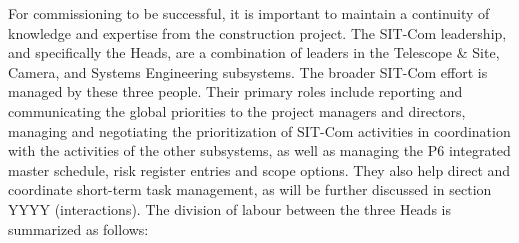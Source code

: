 \documentclass[SE,toc]{lsstdoc}
\begin{document}
For commissioning to be successful, it is important to maintain a continuity of knowledge and expertise from the construction project.
The SIT-Com leadership, and specifically the Heads, are a combination of leaders in the Telescope \& Site, Camera, and Systems Engineering subsystems.
The broader SIT-Com effort is managed by these three people.
Their primary roles include reporting and communicating the global priorities to the project managers and directors, managing and negotiating the prioritization of SIT-Com activities in coordination with the activities of the other subsystems, as well as managing the P6 integrated master schedule, risk register entries and scope options.
They also help direct and coordinate short-term task management, as will be further discussed in section YYYY (interactions).
The division of labour between the three Heads is summarized as follows:
\end{document}
